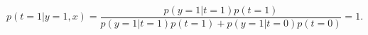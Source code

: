 \begin{answer}
	\[
	    p(t=1|y=1,x)
		=
		\frac{p(y=1|t=1)p(t=1)}
		{p(y=1|t=1)p(t=1)+p(y=1|t=0)p(t=0)}
		=
		1
	.\] 
\end{answer}
